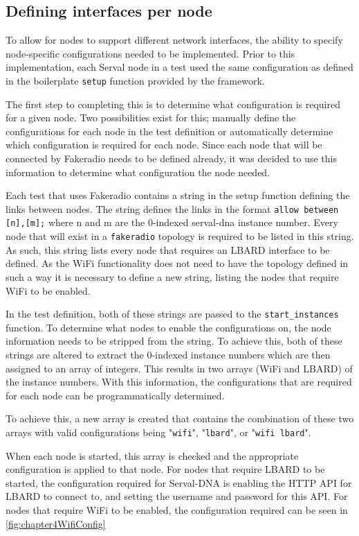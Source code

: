 \subsection{Defining interfaces per node}
\label{subsection:DefiningInterfaces}
To allow for nodes to support different network interfaces, the ability to specify node-specific configurations needed to be implemented.
Prior to this implementation, each Serval node in a test used the same configuration as defined in the boilerplate \texttt{setup} function provided by the framework.

The first step to completing this is to determine what configuration is required for a given node.
Two possibilities exist for this; manually define the configurations for each node in the test definition or automatically determine which configuration is required for each node.
Since each node that will be connected by Fakeradio needs to be defined already, it was decided to use this information to determine what configuration the node needed.

Each test that uses Fakeradio contains a string in the setup function defining the links between nodes.
The string defines the links in the format \texttt{allow between [n],[m];} where n and m are the 0-indexed serval-dna instance number.
Every node that will exist in a \texttt{fakeradio} topology is required to be listed in this string.
As such, this string lists every node that requires an LBARD interface to be defined.
As the WiFi functionality does not need to have the topology defined in such a way it is necessary to define a new string, listing the nodes that require WiFi to be enabled. 

In the test definition, both of these strings are passed to the \texttt{start\_instances} function.
To determine what nodes to enable the configurations on, the node information needs to be stripped from the string.
To achieve this, both of these strings are altered to extract the 0-indexed instance numbers which are then assigned to an array of integers.
This results in two arrays (WiFi and LBARD) of the instance numbers.
With this information, the configurations that are required for each node can be programmatically determined.

To achieve this, a new array is created that contains the combination of these two arrays with valid configurations being "\texttt{wifi}", "\texttt{lbard}", or "\texttt{wifi lbard}".

When each node is started, this array is checked and the appropriate configuration is applied to that node.
For nodes that require LBARD to be started, the configuration required for Serval-DNA is enabling the HTTP API for LBARD to connect to, and setting the username and password for this API.
For nodes that require WiFi to be enabled, the configuration required can be seen in \figurename{ \ref{fig:chapter4WifiConfig}}


